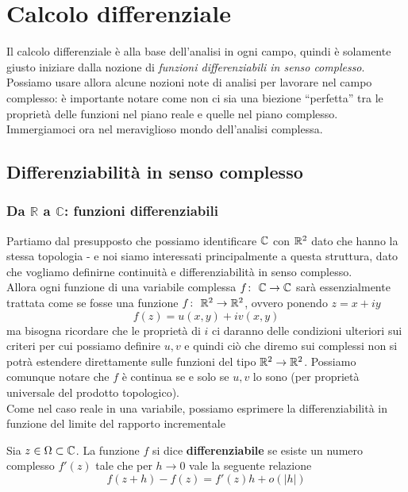 \chapter{Calcolo differenziale}
Il calcolo differenziale è alla base dell'analisi in ogni campo, quindi è solamente giusto iniziare dalla nozione di \textit{funzioni differenziabili in senso complesso}.\\
Possiamo usare allora alcune nozioni note di analisi per lavorare nel campo complesso: è importante notare come non ci sia una biezione \enquote{perfetta} tra le proprietà delle funzioni nel piano reale e quelle nel piano complesso. Immergiamoci ora nel meraviglioso mondo dell'analisi complessa.
\newpage
\section{Differenziabilità in senso complesso}
\subsection{\textcolor{AnComp}{\textbf{Da $\mathbb{R}$ a $\mathbb{C}$: funzioni differenziabili}}}

Partiamo dal presupposto che possiamo identificare $\mathbb{C}$ con $\mathbb{R}^2$ dato che hanno la stessa topologia - e noi siamo interessati principalmente a questa struttura, dato che vogliamo definirne continuità e  differenziabilità in senso complesso. \\ Allora ogni funzione di una variabile complessa $f \colon\ \mathbb{C} \rightarrow \mathbb{C}$ sarà essenzialmente trattata come se fosse una funzione $f \colon\ \mathbb{R}^2 \rightarrow \mathbb{R}^2$, ovvero ponendo $z = x + iy$
\begin{equation}
	f(z) = u(x,y) + iv(x,y)
\end{equation}
ma bisogna ricordare che le proprietà di $i$ ci daranno delle condizioni ulteriori sui criteri per cui possiamo definire $u, v$ e quindi ciò che diremo sui complessi non si potrà estendere direttamente sulle funzioni del tipo $\mathbb{R}^2 \to \mathbb{R}^2$. Possiamo comunque notare che $f$ è continua se e solo se $u,v$ lo sono (per proprietà universale del prodotto topologico).\\

Come nel caso reale in una variabile, possiamo esprimere la differenziabilità in funzione del limite del rapporto incrementale

\begin{definition}
	Sia $z \in \Omega \subset \mathbb{C}$. La funzione $f$ si dice \textbf{differenziabile} se esiste un numero complesso $f'(z)$ tale che per $h \to 0$ vale la seguente relazione
	\begin{equation}
		f(z+ h) - f(z) = f'(z)h + o(|h|)
	\end{equation} 
\end{definition}

